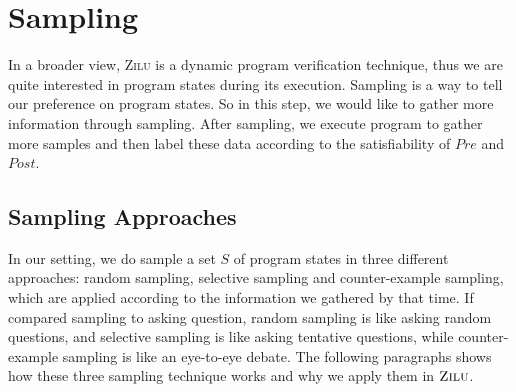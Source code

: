 
\section{Sampling} %
\label{sec:sampling}
In a broader view, \textsc{Zilu} is a dynamic program verification technique, 
thus we are quite interested in program states during its execution.
Sampling is a way to tell our preference on program states. 
So in this step, we would like to gather more information through sampling.
After sampling, we execute program to gather more samples and then label these data according to the satisfiability of $Pre$ and $Post$.

\subsection{Sampling Approaches}
In our setting, we do sample a set $S$ of program states in three different approaches: 
random sampling, selective sampling and counter-example sampling, 
which are applied according to the information we gathered by that time.
If compared sampling to asking question, random sampling is like asking random questions,
and selective sampling is like asking tentative questions, 
while counter-example sampling is like an eye-to-eye debate.
The following paragraphs shows how these three sampling technique works and why we apply them in $\textsc{Zilu}$.


